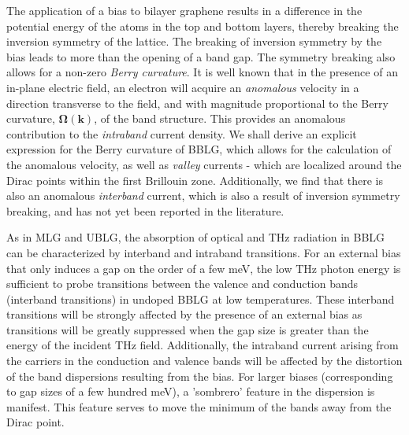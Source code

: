 \documentclass[twocolumn,secnumarabic,amssymb, nobibnotes, aps, prd, superscriptaddress]{revtex4-1}
\begin{document}
The application of a bias to bilayer graphene results in a difference in the potential energy of the atoms in the top and bottom layers, thereby breaking the inversion symmetry of the lattice. The breaking of inversion symmetry by the bias leads to more than the opening of a band gap. The symmetry breaking also allows for a non-zero \textit{Berry curvature}. It is well known that in the presence of an in-plane electric field, an electron will acquire an \textit{anomalous} velocity in a direction transverse to the field, and with magnitude proportional to the Berry curvature, $\mathbf{\Omega}(\mathbf{k})$, of the band structure\cite{chang1996berry, xiao2010berry}. This provides an anomalous contribution to the \textit{intraband} current density. We shall derive an explicit expression for the Berry curvature of BBLG, which allows for the calculation of the anomalous velocity, as well as \textit{valley} currents - which are localized around the Dirac points within the first Brillouin zone. Additionally, we find that there is also an anomalous \textit{interband} current, which is also a result of inversion symmetry breaking, and has not yet been reported in the literature. 


As in MLG and UBLG, the absorption of optical and THz radiation in BBLG can be characterized by interband and intraband transitions. For an external bias that only induces a gap on the order of a few meV, the low THz photon energy is sufficient to probe transitions between the valence and conduction bands (interband transitions) in undoped BBLG at low temperatures. These interband transitions will be strongly affected by the presence of an external bias as transitions will be greatly suppressed when the gap size is greater than the energy of the incident THz field. Additionally, the intraband current arising from the carriers in the conduction and valence bands will be affected by the distortion of the band dispersions resulting from the bias. For larger biases (corresponding to gap sizes of a few hundred meV), a 'sombrero' feature in the dispersion is manifest\cite{mccann2006asymmetry, castro2007biased, nicol2008optical}. This feature serves to move the minimum of the bands away from the Dirac point. 
\end{document}
